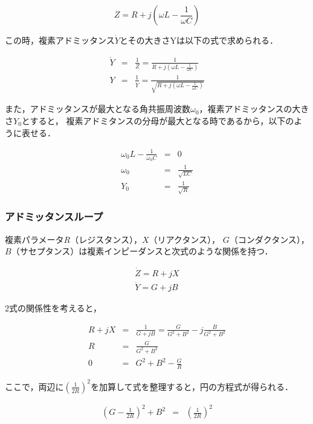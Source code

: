 \documentclass[dvipdfmx,titlepage,a4j]{jsarticle}  %
\begin{document}
\begin{equation}
  Z = R + j(\omega L - \frac{1}{\omega C})
\end{equation}

この時，複素アドミッタンス$\dot{Y}$とその大きさYは以下の式で求められる．

\begin{eqnarray}
  \dot{Y} &=& \frac{1}{Z} = \frac{1}{R + j(\omega L - \frac{1}{\omega C})} \\
  Y &=& \frac{1}{\dot{Y}} = \frac{1}{\sqrt{R + j(\omega L - \frac{1}{\omega C})}}
\end{eqnarray}

また，アドミッタンスが最大となる角共振周波数$\omega_0$，複素アドミッタンスの大きさ$Y_0$とすると，
複素アドミタンスの分母が最大となる時であるから，以下のように表せる．

\begin{eqnarray}
  \omega_0 L - \frac{1}{\omega_0 C} &=& 0 \\
  \omega_0 &=& \frac{1}{\sqrt{LC}} \\
  Y_0 &=& \frac{1}{\sqrt{R}}
\end{eqnarray}

\subsubsection{アドミッタンスループ}

複素パラメータ$R$（レジスタンス），$X$（リアクタンス），
$G$（コンダクタンス），$B$（サセプタンス）は複素インピーダンスと次式のような関係を持つ．

\begin{eqnarray}
  \dot{Z} = R + jX \\
  \dot{Y} = G + jB
\end{eqnarray}

2式の関係性を考えると，

\begin{eqnarray}
  R + jX &=& \frac{1}{G + jB} = \frac{G}{G^2 + B^2} -j\frac{B}{G^2 + B^2} \\
  R &=& \frac{G}{G^2 + B^2} \\
  0 &=& G^2 + B^2 - \frac{G}{R}
\end{eqnarray}

ここで，両辺に$(\frac{1}{2R})^2$を加算して式を整理すると，円の方程式が得られる．

\begin{eqnarray}
  (G - \frac{1}{2R})^2 + B^2 &=& (\frac{1}{2R})^2 \\
\end{eqnarray}
\end{document}
